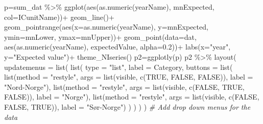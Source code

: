 \documentclass[
]{book}
\newenvironment{Shaded}{\begin{snugshade}}{\end{snugshade}}
\newcommand{\AttributeTok}[1]{\textcolor[rgb]{0.77,0.63,0.00}{#1}}
\newcommand{\CommentTok}[1]{\textcolor[rgb]{0.56,0.35,0.01}{\textit{#1}}}
\newcommand{\ConstantTok}[1]{\textcolor[rgb]{0.00,0.00,0.00}{#1}}
\newcommand{\FloatTok}[1]{\textcolor[rgb]{0.00,0.00,0.81}{#1}}
\newcommand{\FunctionTok}[1]{\textcolor[rgb]{0.00,0.00,0.00}{#1}}
\newcommand{\NormalTok}[1]{#1}
\newcommand{\OtherTok}[1]{\textcolor[rgb]{0.56,0.35,0.01}{#1}}
\newcommand{\SpecialCharTok}[1]{\textcolor[rgb]{0.00,0.00,0.00}{#1}}
\newcommand{\StringTok}[1]{\textcolor[rgb]{0.31,0.60,0.02}{#1}}
\begin{document}
\begin{Shaded}
\begin{Highlighting}[]
\NormalTok{p}\OtherTok{=}\NormalTok{sum\_dat }\SpecialCharTok{\%\textgreater{}\%} 
  \FunctionTok{ggplot}\NormalTok{(}\FunctionTok{aes}\NormalTok{(}\FunctionTok{as.numeric}\NormalTok{(yearName), mnExpected, }\AttributeTok{col=}\NormalTok{ICunitName))}\SpecialCharTok{+}
  \FunctionTok{geom\_line}\NormalTok{()}\SpecialCharTok{+}
  \FunctionTok{geom\_pointrange}\NormalTok{(}\FunctionTok{aes}\NormalTok{(}\AttributeTok{x=}\FunctionTok{as.numeric}\NormalTok{(yearName), }\AttributeTok{y=}\NormalTok{mnExpected, }\AttributeTok{ymin=}\NormalTok{mnLower, }\AttributeTok{ymax=}\NormalTok{mnUpper))}\SpecialCharTok{+}
  \FunctionTok{geom\_point}\NormalTok{(}\AttributeTok{data=}\NormalTok{dat, }\FunctionTok{aes}\NormalTok{(}\FunctionTok{as.numeric}\NormalTok{(yearName), expectedValue, }\AttributeTok{alpha=}\FloatTok{0.2}\NormalTok{))}\SpecialCharTok{+}
  \FunctionTok{labs}\NormalTok{(}\AttributeTok{x=}\StringTok{"year"}\NormalTok{, }\AttributeTok{y=}\StringTok{"Expected value"}\NormalTok{)}\SpecialCharTok{+}
  \FunctionTok{theme\_NIseries}\NormalTok{()}
\NormalTok{p2}\OtherTok{=}\FunctionTok{ggplotly}\NormalTok{(p)}
\NormalTok{p2 }\SpecialCharTok{\%\textgreater{}\%} \FunctionTok{layout}\NormalTok{(}
  \AttributeTok{updatemenus =} \FunctionTok{list}\NormalTok{(}
    \FunctionTok{list}\NormalTok{(}
      \AttributeTok{type =} \StringTok{"list"}\NormalTok{,}
      \AttributeTok{label =} \StringTok{\textquotesingle{}Category\textquotesingle{}}\NormalTok{,}
      \AttributeTok{buttons =} \FunctionTok{list}\NormalTok{(}
        \FunctionTok{list}\NormalTok{(}\AttributeTok{method =} \StringTok{"restyle"}\NormalTok{,}
             \AttributeTok{args =} \FunctionTok{list}\NormalTok{(}\StringTok{\textquotesingle{}visible\textquotesingle{}}\NormalTok{, }\FunctionTok{c}\NormalTok{(}\ConstantTok{TRUE}\NormalTok{, }\ConstantTok{FALSE}\NormalTok{, }\ConstantTok{FALSE}\NormalTok{)),}
             \AttributeTok{label =} \StringTok{"Nord{-}Norge"}\NormalTok{),}
        \FunctionTok{list}\NormalTok{(}\AttributeTok{method =} \StringTok{"restyle"}\NormalTok{,}
             \AttributeTok{args =} \FunctionTok{list}\NormalTok{(}\StringTok{\textquotesingle{}visible\textquotesingle{}}\NormalTok{, }\FunctionTok{c}\NormalTok{(}\ConstantTok{FALSE}\NormalTok{, }\ConstantTok{TRUE}\NormalTok{, }\ConstantTok{FALSE}\NormalTok{)),}
             \AttributeTok{label =} \StringTok{"Norge"}\NormalTok{),}
        \FunctionTok{list}\NormalTok{(}\AttributeTok{method =} \StringTok{"restyle"}\NormalTok{,}
             \AttributeTok{args =} \FunctionTok{list}\NormalTok{(}\StringTok{\textquotesingle{}visible\textquotesingle{}}\NormalTok{, }\FunctionTok{c}\NormalTok{(}\ConstantTok{FALSE}\NormalTok{, }\ConstantTok{FALSE}\NormalTok{, }\ConstantTok{TRUE}\NormalTok{)),}
             \AttributeTok{label =} \StringTok{"Sør{-}Norge"}\NormalTok{)}
\NormalTok{      )}
\NormalTok{    )}
\NormalTok{  )}
\NormalTok{) }\CommentTok{\# Add drop down menus for the data}
\end{Highlighting}
\end{Shaded}
\end{document}
